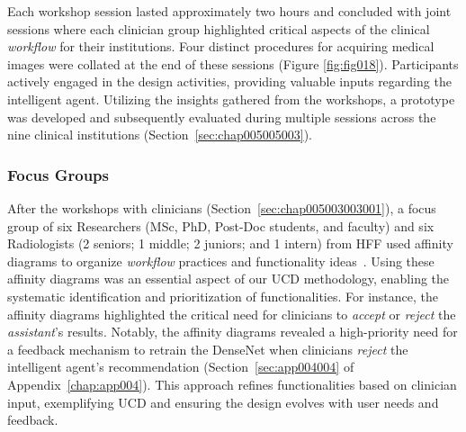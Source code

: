 
\textcolor{revised}{Each workshop session lasted approximately two hours and concluded with joint sessions where each clinician group highlighted critical aspects of the clinical {\it workflow} for their institutions.
Four distinct procedures for acquiring medical images were collated at the end of these sessions (Figure \ref{fig:fig018}).
Participants actively engaged in the design activities, providing valuable inputs regarding the intelligent agent.
Utilizing the insights gathered from the workshops, a prototype was developed and subsequently evaluated during multiple sessions across the nine clinical institutions (Section~\ref{sec:chap005005003}).}

\subsubsection{Focus Groups}
\label{sec:chap005003003002}

\textcolor{revised}{After the workshops with clinicians (Section~\ref{sec:chap005003003001}), a focus group of six Researchers (\acs{MSc}, \acs{PhD}, Post-Doc students, and faculty) and six Radiologists (2 seniors; 1 middle; 2 juniors; and 1 intern) from \acs{HFF} used affinity diagrams to organize {\it workflow} practices and functionality ideas~\cite{CALISTO2021102607}.
Using these affinity diagrams was an essential aspect of our \ac{UCD} methodology, enabling the systematic identification and prioritization of functionalities.
For instance, the affinity diagrams highlighted the critical need for clinicians to {\it accept} or {\it reject} the {\it assistant}'s results.
Notably, the affinity diagrams revealed a high-priority need for a feedback mechanism to retrain the DenseNet when clinicians {\it reject} the intelligent agent's recommendation (Section~\ref{sec:app004004} of Appendix~\ref{chap:app004}).
This approach refines functionalities based on clinician input, exemplifying \ac{UCD} and ensuring the design evolves with user needs and feedback.}

